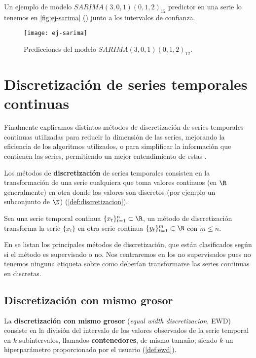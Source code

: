Un ejemplo de modelo $SARIMA(3, 0, 1)(0, 1, 2)_12$ predictor en una serie lo tenemos en \autoref{fig:ej-sarima} (\cite{hyndman2018forecasting}) junto a los intervalos de confianza.

\begin{figure}[htpb]
  \centering
  \texttt{[image: ej-sarima]}
  \caption{Predicciones del modelo $SARIMA(3, 0, 1)(0, 1, 2)_12$.}
  \label{fig:ej-sarima}
\end{figure}

\section{Discretización de series temporales continuas}

Finalmente explicamos distintos métodos de discretización de series temporales continuas utilizadas para reducir la dimensión de las series, mejorando la eficiencia de los algoritmos utilizados, o para simplificar la información que contienen las series, permitiendo un mejor entendimiento de estas \cite{chaudhari2014discretization}.

Los métodos de \textbf{discretización} de series temporales consisten en la transformación de una serie cualquiera que toma valores continuos (en $\R$ generalmente) en otra donde los valores son discretos (por ejemplo un subconjunto de $\N$) (\autoref{def:discretizacion}).

\begin{definicion}[Discretización]
  Sea una serie temporal continua $\{x_t\}_{t = 1}^n \subset \R$, un método de discretización transforma la serie $\{x_t\}$ en otra serie continua $\{y_t\}_{t = 1}^m \subset \N$ con $m \leq n$.
  \label{def:discretizacion}
\end{definicion}

En \cite{chaudhari2014discretization} se listan los principales métodos de discretización, que están clasificados según si el método es supervisado o no. Nos centraremos en los no supervisados pues no tenemos ninguna etiqueta sobre como deberían transformarse las series continuas en discretas.

\subsection{Discretización con mismo grosor}

La \textbf{discretización con mismo grosor} (\emph{equal width discretizacion}, EWD) consiste en la división del intervalo de los valores observados de la serie temporal en $k$ subintervalos, llamados \textbf{contenedores}, de mismo tamaño; siendo $k$ un hiperparámetro proporcionado por el usuario (\autoref{def:ewd}).

